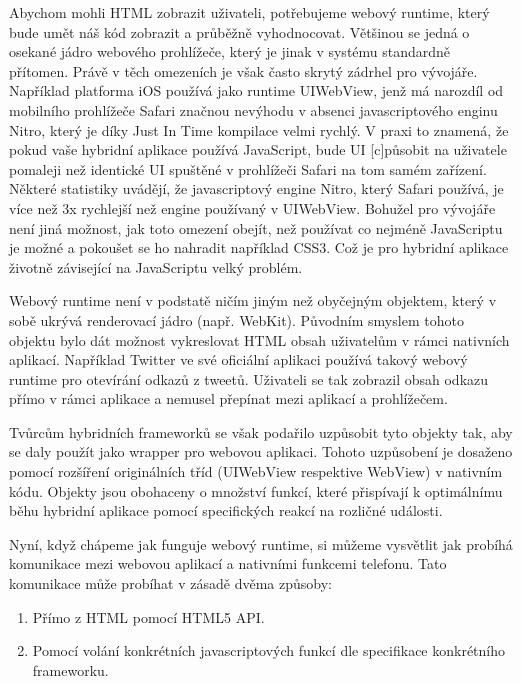 Abychom mohli HTML zobrazit uživateli, potřebujeme webový runtime, který bude umět náš kód zobrazit a průběžně vyhodnocovat. Většinou se jedná o osekané jádro webového prohlížeče, který je jinak v systému standardně přítomen. Právě v těch omezeních je však často skrytý zádrhel pro vývojáře. Například platforma iOS používá jako runtime UIWebView, jenž má narozdíl od mobilního prohlížeče Safari značnou nevýhodu v absenci javascriptového enginu Nitro, který je díky Just In Time kompilace velmi rychlý. V praxi to znamená, že pokud vaše hybridní aplikace používá JavaScript, bude UI [c]působit na uživatele pomaleji než identické UI spuštěné v prohlížeči Safari na tom samém zařízení. \cite{primer_on_hybrid_apps} Některé statistiky uvádějí, že javascriptový engine Nitro, který Safari používá, je více než 3x rychlejší než engine používaný v UIWebView. \cite{ios_for_html5_developer} Bohužel pro vývojáře není jiná možnost, jak toto omezení obejít, než používat co nejméně JavaScriptu je možné a pokoušet se ho nahradit například CSS3. Což je pro hybridní aplikace životně závisející na JavaScriptu velký problém.

Webový runtime není v podstatě ničím jiným než obyčejným objektem, který v sobě ukrývá renderovací jádro (např. WebKit). Původním smyslem tohoto objektu bylo dát možnost vykreslovat HTML obsah uživatelům v rámci nativních aplikací. Například Twitter ve své oficiální aplikaci používá takový webový runtime pro otevírání odkazů z tweetů. Uživateli se tak zobrazil obsah odkazu přímo v rámci aplikace a nemusel přepínat mezi aplikací a prohlížečem.

Tvůrcům hybridních frameworků se však podařilo uzpůsobit tyto objekty tak, aby se daly použít jako wrapper pro webovou aplikaci. Tohoto uzpůsobení je dosaženo pomocí rozšíření originálních tříd (UIWebView respektive WebView) v nativním kódu. Objekty jsou obohaceny o množství funkcí, které přispívají k optimálnímu běhu hybridní aplikace pomocí specifických reakcí na rozličné události.

Nyní, když chápeme jak funguje webový runtime, si můžeme vysvětlit jak probíhá komunikace mezi webovou aplikací a nativními funkcemi telefonu. Tato komunikace může probíhat v zásadě dvěma způsoby:

\begin{enumerate}
	\item Přímo z HTML pomocí HTML5 API.
	\item Pomocí volání konkrétních javascriptových funkcí dle specifikace konkrétního frameworku.
\end{enumerate}

